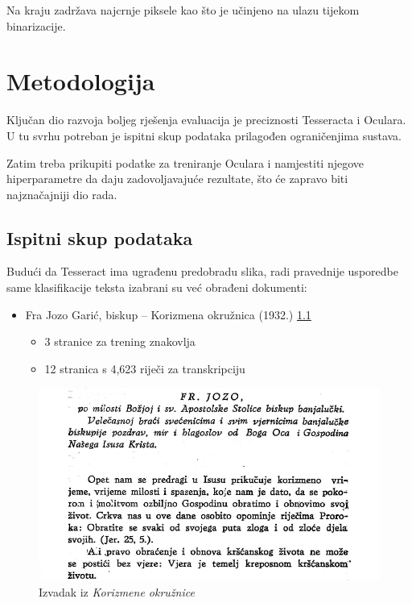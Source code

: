 \documentclass[zavrsnirad]{fer}
\begin{document}
Na kraju zadržava najcrnje piksele kao što je učinjeno na ulazu tijekom binarizacije.








\chapter{Metodologija}
\label{pog:metodologija}

Ključan dio razvoja boljeg rješenja evaluacija je preciznosti Tesseracta i Oculara. U tu svrhu potreban je ispitni skup podataka prilagođen ograničenjima sustava. 

Zatim treba prikupiti podatke za treniranje Oculara i namjestiti njegove hiperparametre da daju zadovoljavajuće rezultate, što će zapravo biti najznačajniji dio rada.


\section{Ispitni skup podataka}

Budući da Tesseract ima ugrađenu predobradu slika, radi pravednije usporedbe same klasifikacije teksta izabrani su već obrađeni dokumenti:

\begin{itemize}
	\item Fra Jozo Garić, biskup – Korizmena okružnica (1932.) \ref{slk:korizmena}
	\begin{itemize}
		\item 3 stranice za trening znakovlja
		\item 12 stranica s 4,623 riječi za transkripciju
	\end{itemize}
\end{itemize}

\begin{figure}[H]
	\centering
	\includegraphics[width=1.0\linewidth]{Figures/korizmena.png} 
	\caption{Izvadak iz \textit{Korizmene okružnice}}
	\label{slk:korizmena}
\end{figure}
\end{document}
